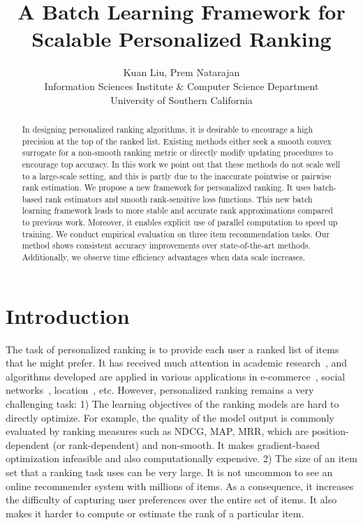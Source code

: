 \documentclass[letterpaper]{article}
\begin{document}
\title{A Batch Learning Framework for Scalable Personalized Ranking}
\author{Kuan Liu, Prem Natarajan\\
Information Sciences Institute \& Computer Science Department\\
University of Southern California\\
}
\maketitle
\begin{abstract}
In designing personalized ranking algorithms, it is desirable to encourage a high precision at the top of the ranked list. Existing methods either seek a smooth convex surrogate for a non-smooth ranking metric or directly modify updating procedures to encourage top accuracy. In this work we point out that these methods do not scale well to a large-scale setting, and this is partly due to the inaccurate pointwise or pairwise rank estimation. We propose a new framework for personalized ranking. It uses batch-based rank estimators and smooth rank-sensitive loss functions. This new batch learning framework leads to more stable and accurate rank approximations compared to previous work. Moreover, it enables explicit use of parallel computation to speed up training. We conduct empirical evaluation on three item recommendation tasks. Our method shows consistent accuracy improvements over state-of-the-art methods. Additionally, we observe time efficiency advantages when data scale increases.



\end{abstract}

\section{Introduction}

The task of personalized ranking is to provide each user a ranked list of items that he might prefer. It has received much attention in academic research~\cite{hu2008collaborative,rendle2009bpr,he2016fast}, and algorithms developed are applied in various applications in e-commerce~\cite{linden2003amazon}, social networks~\cite{chen2009make}, location~\cite{liu2014exploiting}, etc. However, personalized ranking remains a very challenging task: 1) The learning objectives of the ranking models are hard to directly optimize. For example, the quality of the model output is commonly evaluated by ranking measures such as NDCG, MAP, MRR, which are position-dependent (or rank-dependent) and non-smooth. It makes gradient-based optimization infeasible and also computationally expensive. 2) The size of an item set that a ranking task uses can be very large. It is not uncommon to see an online recommender system with millions of items. As a consequence, it increases the difficulty of capturing user preferences over the entire set of items. It also makes it harder to compute or estimate the rank of a particular item.
\end{document}
